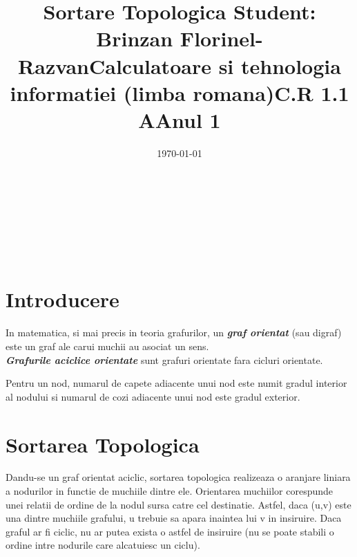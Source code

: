 \documentclass[14pt]{article}
\begin{document}
\title{\huge Sortare Topologica }
\date{\today}
\maketitle
\begin{center}
\vspace{30 mm}

\title{\huge Student: Brinzan Florinel-Razvan}
\\\vspace{10 mm}
\title{\huge Calculatoare si tehnologia informatiei (limba romana)}
\\\vspace{10 mm}
\title{\huge C.R 1.1 A}
\\\vspace{10 mm}
\title{\huge Anul 1}
\date{}
\maketitle

\newpage
\section*{Introducere}
\end{center}
\vspace{20 mm}

In matematica, si mai precis in teoria grafurilor, un  \textbf{\textit{graf orientat}} (sau digraf) este un graf ale carui muchii au asociat un sens.
\\
\textbf{\textit{Grafurile aciclice orientate}} sunt grafuri orientate fara cicluri orientate.


\vspace{10 mm}

Pentru un nod, numarul de capete adiacente unui nod este numit gradul interior al nodului si numarul de cozi adiacente unui nod este gradul exterior.

\vspace{10 mm}

\section*{Sortarea Topologica}
\vspace{10 mm}

Dandu-se un graf orientat aciclic, sortarea topologica realizeaza o aranjare liniara a nodurilor in functie de muchiile dintre ele. Orientarea muchiilor corespunde unei relatii de ordine de la nodul sursa catre cel destinatie. Astfel, daca (u,v) este una dintre muchiile grafului, u trebuie sa apara inaintea lui v in insiruire. Daca graful ar fi ciclic, nu ar putea exista o astfel de insiruire (nu se poate stabili o ordine intre nodurile care alcatuiesc un ciclu). 
\end{document}
